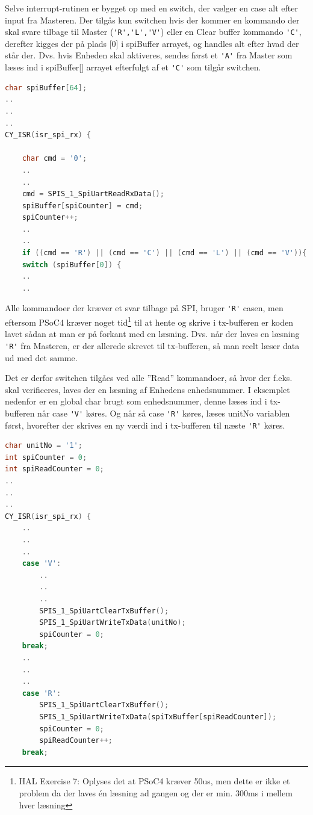 Selve interrupt-rutinen er bygget op med en switch, der vælger en case alt efter input fra Masteren. Der tilgås kun switchen hvis der kommer en kommando der skal svare tilbage til Master (\verb+'R','L','V'+) eller en Clear buffer kommando \verb+'C'+, derefter kigges der på plads [0] i spiBuffer arrayet, og handles alt efter hvad der står der. Dvs. hvis Enheden skal aktiveres, sendes først et \verb+'A'+ fra Master som læses ind i spiBuffer[] arrayet efterfulgt af et \verb+'C'+ som tilgår switchen.
 
\begin{lstlisting}[language=C]
char spiBuffer[64];
..
..
..
CY_ISR(isr_spi_rx) {

	char cmd = '0';
	..
	.. 
	cmd = SPIS_1_SpiUartReadRxData();  
	spiBuffer[spiCounter] = cmd;
	spiCounter++;
	..
	..
	if ((cmd == 'R') || (cmd == 'C') || (cmd == 'L') || (cmd == 'V')){
	switch (spiBuffer[0]) {
	..
	..
\end{lstlisting}

Alle kommandoer der kræver et svar tilbage på SPI, bruger \verb+'R'+ casen, men eftersom PSoC4 kræver noget tid\footnote{HAL Exercise 7: Oplyses det at PSoC4 kræver 50us, men dette er ikke et problem da der laves én læsning ad gangen og der er min. 300ms i mellem hver læsning} til at hente og skrive i tx-bufferen er koden lavet sådan at man er på forkant med en læsning. Dvs. når der laves en læsning \verb+'R'+ fra Masteren, er der allerede skrevet til tx-bufferen, så man reelt læser data ud med det samme. 

Det er derfor switchen tilgåes ved alle ''Read'' kommandoer, så hvor der f.eks. skal verificeres, laves der en læsning af Enhedens enhedsnummer. I eksemplet nedenfor er en global char brugt som enhedsnummer, denne læses ind i tx-bufferen når case \verb+'V'+ køres. Og når så case \verb+'R'+ køres, læses unitNo variablen først, hvorefter der skrives en ny værdi ind i tx-bufferen til næste \verb+'R'+ køres.

\begin{lstlisting}[language=C]
char unitNo = '1';
int spiCounter = 0;
int spiReadCounter = 0;
..
..
..
CY_ISR(isr_spi_rx) {
	..
	..
	..
	case 'V':
		..
		..
		..
		SPIS_1_SpiUartClearTxBuffer();
		SPIS_1_SpiUartWriteTxData(unitNo);
		spiCounter = 0;
	break;
	..
	..
	..
	case 'R':
		SPIS_1_SpiUartClearTxBuffer();
		SPIS_1_SpiUartWriteTxData(spiTxBuffer[spiReadCounter]);
		spiCounter = 0;
		spiReadCounter++;
	break;
\end{lstlisting}